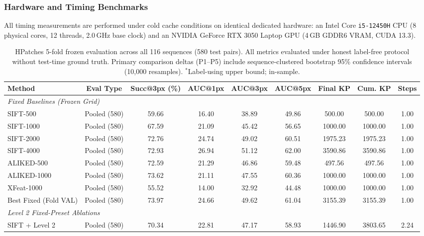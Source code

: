 \documentclass[conference]{IEEEtran}
\begin{document}
\subsubsection{Hardware and Timing Benchmarks}
All timing measurements are performed under cold cache conditions on identical dedicated hardware: an Intel Core \texttt{i5-12450H} CPU (8 physical cores, 12 threads, 2.0\,GHz base clock) and an NVIDIA GeForce RTX 3050 Laptop GPU (4\,GB GDDR6 VRAM, CUDA 13.3).

\begin{table}[t]
\centering
\setlength{\tabcolsep}{2.5pt}
\footnotesize
\caption{HPatches 5-fold frozen evaluation across all 116 sequences (580 test pairs). All metrics evaluated under honest label-free protocol without test-time ground truth. Primary comparison deltas (P1--P5) include sequence-clustered bootstrap 95\% confidence intervals (10,000 resamples). $^*$Label-using upper bound; in-sample.}
\label{tab:hpatches_main}
\begin{tabular}{lcccccccc}
\hline
\textbf{Method} & \textbf{Eval Type} & \textbf{Succ@3px (\%)} & \textbf{AUC@1px} & \textbf{AUC@3px} & \textbf{AUC@5px} & \textbf{Final KP} & \textbf{Cum. KP} & \textbf{Steps} \\
\hline
\multicolumn{9}{l}{\textit{Fixed Baselines (Frozen Grid)}} \\
SIFT-500 & Pooled (580) & 59.66 & 16.40 & 38.89 & 49.86 & 500.00 & 500.00 & 1.00 \\
SIFT-1000 & Pooled (580) & 67.59 & 21.09 & 45.42 & 56.65 & 1000.00 & 1000.00 & 1.00 \\
SIFT-2000 & Pooled (580) & 72.76 & 24.74 & 49.02 & 60.51 & 1975.23 & 1975.23 & 1.00 \\
SIFT-4000 & Pooled (580) & 72.93 & 26.94 & 51.12 & 62.00 & 3590.86 & 3590.86 & 1.00 \\
ALIKED-500 & Pooled (580) & 72.59 & 21.29 & 46.86 & 59.48 & 497.56 & 497.56 & 1.00 \\
ALIKED-1000 & Pooled (580) & 73.62 & 21.11 & 47.55 & 60.36 & 1000.00 & 1000.00 & 1.00 \\
XFeat-1000 & Pooled (580) & 55.52 & 14.00 & 32.92 & 44.48 & 1000.00 & 1000.00 & 1.00 \\
Best Fixed (Fold VAL) & Pooled (580) & 73.97 & 24.66 & 49.62 & 61.04 & 3155.39 & 3155.39 & 1.00 \\
\hline
\multicolumn{9}{l}{\textit{Level 2 Fixed-Preset Ablations}} \\
SIFT + Level 2 & Pooled (580) & 70.34 & 22.81 & 47.17 & 58.93 & 1446.90 & 3803.65 & 2.24 \\

\end{tabular}
\end{table}
\end{document}
